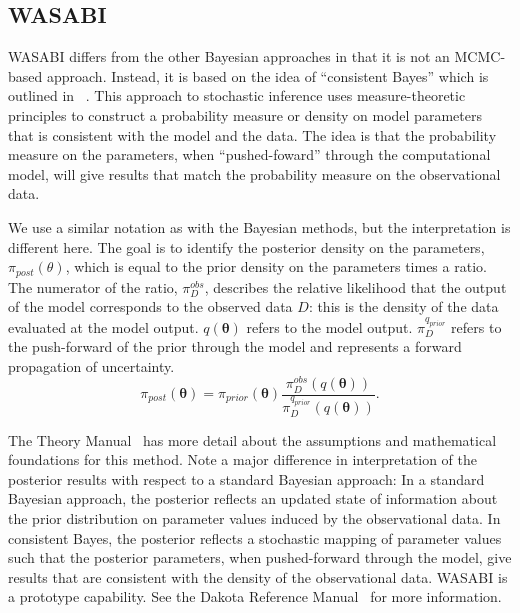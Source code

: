 \subsection{WASABI}
WASABI differs from the other Bayesian approaches in that it is 
not an MCMC-based approach.  Instead, it is based on the idea of 
``consistent Bayes'' which is outlined in ~\cite{Butler2017}.
This approach to stochastic inference uses measure-theoretic 
principles to construct a probability measure or density on model parameters
that is consistent with the model and the data.  The idea is that
the probability measure on the parameters, when ``pushed-foward'' through
the computational model, will give results that match the probability 
measure on the observational data.  

We use a similar notation as with the Bayesian methods, but the interpretation 
is different here.  The goal is to identify the posterior density on the 
parameters, $\pi_{post}({\theta})$, which is equal to the prior density on the 
parameters times a ratio.  The numerator of the ratio, $\pi_{D}^{obs}$, 
describes the relative likelihood that the output of the model corresponds 
to the observed data ${D}$:  this is the density of the data evaluated at 
the model output.  
$q(\boldsymbol{\theta})$ refers to the model output.  
$\pi_{D}^{q_{prior}}$ refers to the push-forward of the prior through the model 
and represents a forward propagation of uncertainty. 
\begin{equation}
\pi_{post}(\boldsymbol{\theta})=\pi_{prior}(\boldsymbol{\theta})\frac{\pi_{D}^{obs}(q(\boldsymbol{\theta}))}{\pi_{D}^{q_{prior}}(q(\boldsymbol{\theta}))}. 
\label{eq:consistentBayesEq}
\end{equation}

The Theory Manual~\cite{TheoMan} has more detail about the assumptions and mathematical foundations 
for this method.  Note a major difference in interpretation of the posterior results with respect to 
a standard Bayesian approach:  In a standard Bayesian approach, the posterior reflects an updated state 
of information about the prior distribution on parameter values induced by the observational data.  
In consistent Bayes, the posterior reflects a stochastic mapping of parameter values such that the posterior 
parameters, when pushed-forward through the model, give results that are consistent with the density 
of the observational data. 
WASABI is a prototype capability.  See the Dakota Reference
Manual~\cite{RefMan} for more information.


